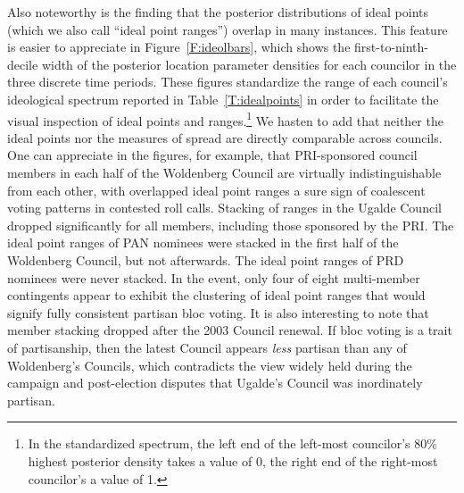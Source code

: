 \documentclass[12 pt, letter]{article}
\begin{document}
Also noteworthy is the finding that the posterior distributions of ideal points (which we also call ``ideal point ranges'') overlap in many instances.  This feature is easier to appreciate in Figure~\ref{F:ideolbars}, which shows the first-to-ninth-decile width of the posterior location parameter densities for each councilor in the three discrete time periods. These figures standardize the range of each council's ideological spectrum reported in Table~\ref{T:idealpoints} in order to facilitate the visual inspection of ideal points and ranges.\footnote{In the standardized spectrum, the left end of the left-most councilor's 80\% highest posterior density takes a value of 0, the right end of the right-most councilor's a value of 1.}  We hasten to add that neither the ideal points nor the measures of spread are directly comparable across councils.  One can appreciate in the figures, for example, that PRI-sponsored council members in each half of the Woldenberg Council are virtually indistinguishable from each other, with overlapped ideal point ranges a sure sign of coalescent voting patterns in contested roll calls. Stacking of ranges in the Ugalde Council dropped significantly for all members, including those sponsored by the PRI.  The ideal point ranges of  PAN nominees were stacked in the first half of the Woldenberg Council, but not afterwards. The ideal point ranges of PRD nominees  were never stacked. In the event, only four of eight multi-member contingents appear to exhibit the clustering of ideal point ranges that would signify fully consistent partisan bloc voting.  It is also interesting to note that member stacking dropped after the 2003 Council renewal. If bloc voting is a trait of partisanship, then the latest Council appears \emph{less} partisan than any of Woldenberg's Councils, which contradicts the view widely held during the campaign and post-election disputes that Ugalde's Council was inordinately partisan.
\end{document}
